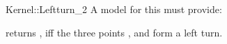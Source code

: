 \begin{ccRefFunctionObjectConcept}{Kernel::Leftturn_2}
A model for this must provide:


{returns , iff the three points ,  
and  form a left turn.}

\end{ccRefFunctionObjectConcept}
